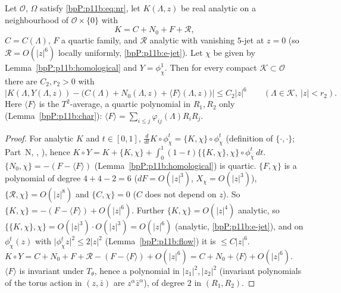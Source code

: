 \begin{proposition}\label{bpP:p11b:lie}
Let $\mathcal O$, $\Omega$ satisfy \eqref{bpP:p11b:eq:nr}, let $K(\Lambda,z)$ be real analytic on a neighbourhood of $\mathcal O\times\{0\}$ with
\[K=C+N_0+F+\mathcal R,\]
$C=C(\Lambda)$, $F$ a quartic family, and $\mathcal R$ analytic with vanishing $5$-jet at $z=0$ (so $\mathcal R=O(\lvert z\rvert^6)$ locally uniformly, \ref{bpP:p11b:e-jet}). Let $\chi$ be given by Lemma~\ref{bpP:p11b:homological} and $Y=\phi^1_\chi$. Then for every compact $\mathcal K\subset\mathcal O$ there are $C_2,r_2>0$ with
\[\Big\lvert K(\Lambda,Y(\Lambda,z))-\big(C(\Lambda)+N_0(\Lambda,z)+\langle F\rangle(\Lambda,z)\big)\Big\rvert\le C_2\lvert z\rvert^6\qquad(\Lambda\in\mathcal K,\ \lvert z\rvert<r_2).\]
Here $\langle F\rangle$ is the $T^2$-average, a quartic polynomial in $R_1,R_2$ only (Lemma~\ref{bpP:p11b:char}): $\langle F\rangle=\sum_{i\le j}\varphi_{ij}(\Lambda)R_iR_j$.
\end{proposition}
\begin{proof}
\label{stepP:p11b:li-tay} For analytic $K$ and $t\in[0,1]$, $\frac d{dt}K\circ\phi^t_\chi=\{K,\chi\}\circ\phi^t_\chi$ (definition of $\{\cdot,\cdot\}$; Part~N, , ), hence $K\circ Y=K+\{K,\chi\}+\int_0^1(1-t)\{\{K,\chi\},\chi\}\circ\phi^t_\chi\,dt$.
\label{stepP:p11b:li-ord} $\{N_0,\chi\}=-(F-\langle F\rangle)$ (Lemma~\ref{bpP:p11b:homological}) is quartic. $\{F,\chi\}$ is a polynomial of degree $4+4-2=6$ ($dF=O(\lvert z\rvert^3)$, $X_\chi=O(\lvert z\rvert^3)$), $\{\mathcal R,\chi\}=O(\lvert z\rvert^8)$ and $\{C,\chi\}=0$ ($C$ does not depend on $z$). So $\{K,\chi\}=-(F-\langle F\rangle)+O(\lvert z\rvert^6)$. Further $\{K,\chi\}=O(\lvert z\rvert^4)$ analytic, so $\{\{K,\chi\},\chi\}=O(\lvert z\rvert^3)\cdot O(\lvert z\rvert^3)=O(\lvert z\rvert^6)$ (analytic, \ref{bpP:p11b:e-jet}), and on $\phi^t_\chi(z)$ with $\lvert\phi^t_\chi z\rvert^2\le2\lvert z\rvert^2$ (Lemma~\ref{bpP:p11b:flow}) it is $\le C\lvert z\rvert^6$.
\label{stepP:p11b:li-sum} $K\circ Y=C+N_0+F+\mathcal R-(F-\langle F\rangle)+O(\lvert z\rvert^6)=C+N_0+\langle F\rangle+O(\lvert z\rvert^6)$. $\langle F\rangle$ is invariant under $T_\theta$, hence a polynomial in $\lvert z_1\rvert^2,\lvert z_2\rvert^2$ (invariant polynomials of the torus action in $(z,\bar z)$ are $z^\alpha\bar z^\alpha$), of degree $2$ in $(R_1,R_2)$.
\end{proof}

